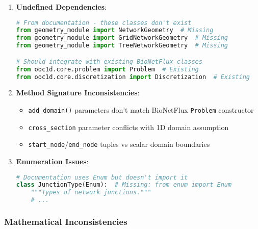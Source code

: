 \begin{enumerate}
    \item \textbf{Undefined Dependencies}:
    \begin{lstlisting}[language=Python, caption=Missing Imports and Dependencies]
# From documentation - these classes don't exist
from geometry_module import NetworkGeometry  # Missing
from geometry_module import GridNetworkGeometry  # Missing
from geometry_module import TreeNetworkGeometry  # Missing

# Should integrate with existing BioNetFlux classes
from ooc1d.core.problem import Problem  # Existing
from ooc1d.core.discretization import Discretization  # Existing
    \end{lstlisting}
    
    \item \textbf{Method Signature Inconsistencies}:
    \begin{itemize}
        \item \texttt{add\_domain()} parameters don't match BioNetFlux \texttt{Problem} constructor
        \item \texttt{cross\_section} parameter conflicts with 1D domain assumption
        \item \texttt{start\_node}/\texttt{end\_node} tuples vs scalar domain boundaries
    \end{itemize}
    
    \item \textbf{Enumeration Issues}:
    \begin{lstlisting}[language=Python, caption=Missing Enum Import]
# Documentation uses Enum but doesn't import it
class JunctionType(Enum):  # Missing: from enum import Enum
    """Types of network junctions."""
    # ...
    \end{lstlisting}
\end{enumerate}

\subsubsection{Mathematical Inconsistencies}

